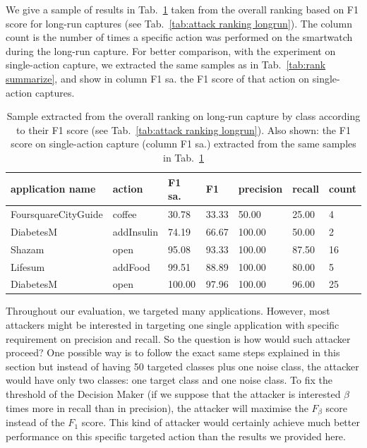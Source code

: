  We give a sample of results in Tab.~\ref{tab:rank summarize longrun} taken from the overall ranking based on F1 score for long-run captures (see Tab.~\ref{tab:attack ranking longrun}). The column count is the number of times a specific action was performed on the smartwatch during the long-run capture. For better comparison, with the experiment on single-action capture, we extracted the same samples as in Tab.~\ref{tab:rank summarize}, and show in column F1 sa. the F1 score of that action on single-action captures.
 \\
 
\begin{table}[H]
\centering
 \begin{tabular}{lllllll} 
 \toprule
 application name & action & F1 sa. & F1 & precision & recall & count \\ [0.5ex] 
 \midrule
FoursquareCityGuide & coffee &   30.78  &   33.33 &      50.00 &   25.00 &      4 \\
DiabetesM & addInsulin       &  74.19  &   66.67 &     100.00 &   50.00 &      2 \\
Shazam & open                &  95.08  &   93.33 &     100.00 &   87.50 &     16 \\
Lifesum & addFood            &  99.51  &   88.89 &     100.00 &   80.00 &      5 \\
DiabetesM & open             &  100.00  &   97.96 &     100.00 &   96.00 &     25 \\
 \bottomrule
\end{tabular}
\caption{Sample extracted from the overall ranking on long-run capture by class according to their F1 score (see Tab.~\ref{tab:attack ranking longrun}). Also shown: the F1 score on single-action capture (column F1 sa.) extracted from the same samples in Tab.~\ref{tab:rank summarize longrun}}
    \label{tab:rank summarize longrun}
\end{table}

\newpage

Throughout our evaluation, we targeted many applications. However, most attackers might be interested in targeting one single application with specific requirement on precision and recall. So the question is how would such attacker proceed? One possible way is to follow the exact same steps explained in this section but instead of having 50 targeted classes plus one noise class, the attacker would have only two classes: one target class and one noise class. To fix the threshold of the Decision Maker (if we suppose that the attacker is interested $\beta$ times more in recall than in precision), the attacker will maximise the $F_\beta$ score instead of the $F_1$ score. This kind of attacker would certainly achieve much better performance on this specific targeted action than the results we provided here.
